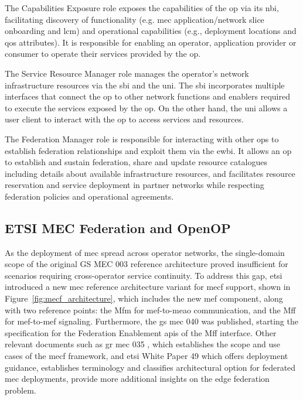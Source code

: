 The Capabilities Exposure role exposes the capabilities of the \ac{op} via its \ac{nbi}, facilitating discovery of functionality (e.g. \ac{mec} application/network slice onboarding and \ac{lcm}) and operational capabilities (e.g., deployment locations and \ac{qos} attributes). It is responsible for enabling an operator, application provider or consumer to operate their services provided by the \ac{op}. 

The Service Resource Manager role manages the operator's network infrastructure resources via the \ac{sbi} and the \ac{uni}. The \ac{sbi} incorporates multiple interfaces that connect the \ac{op} to other network functions and enablers required to execute the services exposed by the \ac{op}. On the other hand, the \ac{uni} allows a user client to interact with the \ac{op} to access services and resources.

The Federation Manager role is responsible for interacting with other \acp{op} to establish federation relationships and exploit them via the \ac{ewbi}. It allows an \ac{op} to establish and sustain federation, share and update resource catalogues including details about available infrastructure resources, and facilitates resource reservation and service deployment in partner networks while respecting federation policies and operational agreements. 

\subsection{ETSI MEC Federation and OpenOP}
\label{sec:openop}

As the deployment of \ac{mec} spread across operator networks, the single-domain scope of the original GS MEC 003 reference architecture proved insufficient for scenarios requiring cross-operator service continuity. To address this gap, \ac{etsi} introduced a new \ac{mec} reference architecture variant for \ac{mecf} support, shown in Figure~\ref{fig:mecf_architecture}, which includes the new \ac{mef} component, along with two reference points: the Mfm for \ac{mef}-to-\ac{meao} communication, and the Mff for \ac{mef}-to-\ac{mef} signaling. Furthermore, the \ac{gs} \ac{mec} 040 \cite{ETSIMultiaccessEdgeComputingMECFederation2023} was published, starting the specification for the Federation Enablement \acp{api} of the Mff interface. Other relevant documents such as \ac{gr} \ac{mec} 035 \cite{ETSIMultiaccessEdgeComputingMECStudy2021}, which establishes the scope and use cases of the \ac{mecf} framework, and \ac{etsi} White Paper 49 which offers deployment guidance, establishes terminology and classifies architectural option for federated \ac{mec} deployments, provide more additional insights on the edge federation problem.

